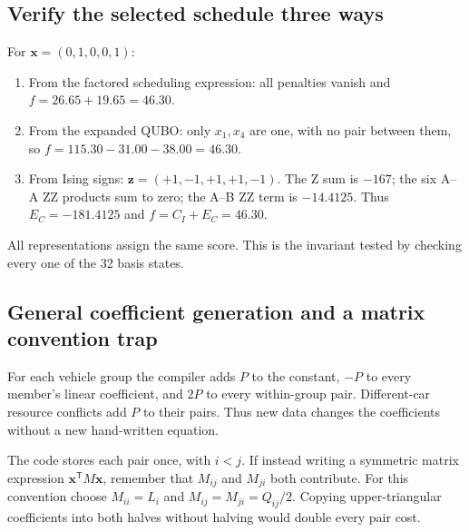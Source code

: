 \subsection{Verify the selected schedule three ways}
For $\boldsymbol{x}=(0,1,0,0,1)$:
\begin{enumerate}
\item From the factored scheduling expression: all penalties vanish and
      $f=26.65+19.65=46.30$.
\item From the expanded QUBO: only $x_1,x_4$ are one, with no pair between
      them, so $f=115.30-31.00-38.00=46.30$.
\item From Ising signs: $\boldsymbol z=(+1,-1,+1,+1,-1)$. The Z sum is $-167$;
      the six A--A ZZ products sum to zero; the A--B ZZ term is $-14.4125$.
      Thus $E_C=-181.4125$ and $f=C_I+E_C=46.30$.
\end{enumerate}
All representations assign the same score. This is the invariant tested by
checking every one of the 32 basis states.

\subsection{General coefficient generation and a matrix convention trap}
For each vehicle group the compiler adds $P$ to the constant, $-P$ to every
member's linear coefficient, and $2P$ to every within-group pair. Different-car
resource conflicts add $P$ to their pairs. Thus new data changes the coefficients
without a new hand-written equation.

The code stores each pair once, with $i<j$. If instead writing a symmetric
matrix expression $\boldsymbol{x}^{\mathsf T}M\boldsymbol{x}$, remember that
$M_{ij}$ and $M_{ji}$ both contribute. For this convention choose
$M_{ii}=L_i$ and $M_{ij}=M_{ji}=Q_{ij}/2$. Copying upper-triangular coefficients
into both halves without halving would double every pair cost.


